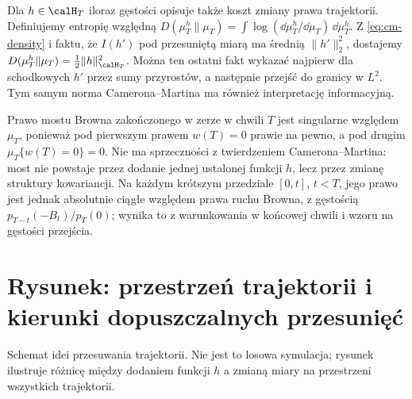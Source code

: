 \begin{przyklad}
Dla $h\in\calH_T$ iloraz gęstości opisuje także koszt
zmiany prawa trajektorii. Definiujemy entropię względną
$D(\mu_T^h\|\mu_T)=\int\log(\dd\mu_T^h/\dd\mu_T)
\,\dd\mu_T^h$. Z \eqref{eq:cm-density} i faktu, że
$I(h')$ pod przesuniętą miarą ma średnią $\|h'\|_2^2$,
dostajemy $D(\mu_T^h\|\mu_T)=\frac12\|h\|_{\calH_T}^2$.
Można ten ostatni fakt wykazać najpierw dla schodkowych
$h'$ przez sumy przyrostów, a następnie przejść do granicy
w $L^2$. Tym samym norma Camerona--Martina ma również
interpretację informacyjną.
\end{przyklad}

\begin{uwaga}
Prawo mostu Browna zakończonego w zerze w chwili $T$
jest singularne względem $\mu_T$, ponieważ pod pierwszym
prawem $w(T)=0$ prawie na pewno, a pod drugim
$\mu_T\{w(T)=0\}=0$. Nie ma sprzeczności z twierdzeniem
Camerona--Martina: most nie powstaje przez dodanie jednej
ustalonej funkcji $h$, lecz przez zmianę struktury kowariancji.
Na każdym krótszym przedziale $[0,t]$, $t<T$,
jego prawo jest jednak absolutnie ciągłe względem
prawa ruchu Browna, z gęstością
$p_{T-t}(-B_t)/p_T(0)$; wynika to z warunkowania
w końcowej chwili i wzoru na gęstości przejścia.
\end{uwaga}

\section{Rysunek: przestrzeń trajektorii i kierunki dopuszczalnych przesunięć}
\begin{center}
\par\smallskip\small Schemat idei przesuwania trajektorii. Nie jest to losowa
symulacja; rysunek ilustruje różnicę między dodaniem funkcji $h$
a zmianą miary na przestrzeni wszystkich trajektorii.
\end{center}

